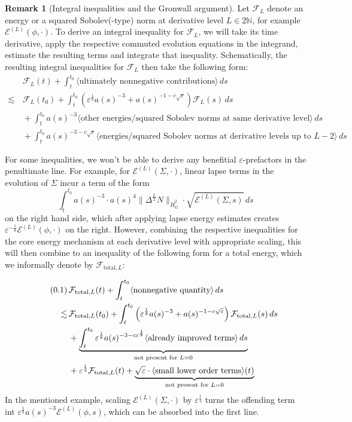 \documentclass[11pt,leqno,textwidth=10cm]{amsart}
\numberwithin{equation}{section}
\theoremstyle{definition}
\newtheorem{remark}[definition]{Remark}
\theoremstyle{plain}
\newcommand{\1}{\mathbbm{1}}
\newcommand{\E}{\mathcal{E}}
\newcommand{\N}{\mathbb{N}}
\renewcommand{\epsilon}{\varepsilon}
\newcommand{\Lap}{\Delta}
\newcommand{\numberthis}{\addtocounter{equation}{1}\tag{\theequation}}
\renewcommand{\theequation}{\arabic{section}.\arabic{equation}}
\newcommand{\change}[1]{\color{black}#1\color{black}}
\begin{document}
\begin{remark}[Integral inequalities and the Gronwall argument]\label{rem:en-est-strat}
Let $\mathcal{F}_L$ denote an energy or a squared Sobolev(-type) norm at derivative level $L\in2\N$, for example $\E^{(L)}(\phi,\cdot)$. To derive an integral inequality for $\mathcal{F}_L$, we will take its time derivative, apply the respective commuted evolution equations in the integrand, estimate the resulting terms and integrate that inequality. Schematically, the resulting integral inequalities for $\mathcal{F}_L$ then take the following form:
\begin{align*}
&\,\mathcal{F}_L(t)+\int_t^{t_0}\langle\text{ultimately nonnegative contributions}\rangle\,ds\\
\lesssim&\,\mathcal{F}_L(t_0)+\int_t^{t_0}\left(\epsilon^\frac18a(s)^{-3}+a(s)^{-1-c\sqrt{\epsilon}}\right)\mathcal{F}_L(s)\,ds\\
&\,+\int_t^{t_0}a(s)^{-3}\langle\text{other energies/squared Sobolev norms at same derivative level}\rangle\,ds\\
&\,+\int_t^{t_0}a(s)^{-3-c\sqrt{\epsilon}}\langle\text{energies/squared Sobolev norms at derivative levels up to }L-2\rangle\,ds
\end{align*}

For some inequalities, we won't be able to derive any \change{benefitial }$\epsilon$-prefactors in the penultimate line. \change{For example, for $\E^{(L)}(\Sigma,\cdot)$, linear lapse terms in the evolution of $\Sigma$ incur a term of the form
\[\int_t^{t_0}a(s)^{-3}\cdot a(s)^4\|\Lap^\frac{L}2N\|_{\dot{H}^2_G}\cdot\sqrt{\E^{(L)}(\Sigma,s)}\,ds\]
on the right hand side, which after applying lapse energy estimates creates $\epsilon^{-\frac18}\E^{(L)}(\phi,\cdot)$ on the right}. However, combining the respective inequalities for the core energy mechanism at each derivative level with appropriate scaling, this will then combine to an inequality of the following form for a total energy, which we informally denote by $\mathcal{F}_{\text{total},L}$:

\change{\begin{align*}
\numberthis\label{eq:toy-energy}&\,\mathcal{F}_{\text{total},L}(t)+\int_t^{t_0}\langle\text{nonnegative quantity}\rangle\,ds\\
\lesssim&\,\mathcal{F}_{\text{total},L}(t_0)+\int_t^{t_0}\left(\epsilon^\frac18a(s)^{-3}+a(s)^{-1-c\sqrt{\epsilon}}\right)\mathcal{F}_{\text{total},L}(s)\,ds\\
&\,+\underbrace{\int_t^{t_0}\epsilon^\frac18 a(s)^{-3-c\epsilon^\frac18}\langle\text{already improved terms}\rangle\,ds}_{\text{not present for }L=0}\\
&\,+\epsilon^\frac14\mathcal{F}_{\text{total},L}(t)+\underbrace{\sqrt{\epsilon}\cdot\langle\text{small lower order terms}\rangle(t)}_{\text{not present for }L=0}
\end{align*}
In the mentioned example, scaling $\E^{(L)}(\Sigma,\cdot)$ by $\epsilon^\frac14$ turns the offending term int $\epsilon^\frac18a(s)^{-3}\E^{(L)}(\phi,s)$, which can be absorbed into the first line.\\}


\end{remark}
\end{document}
